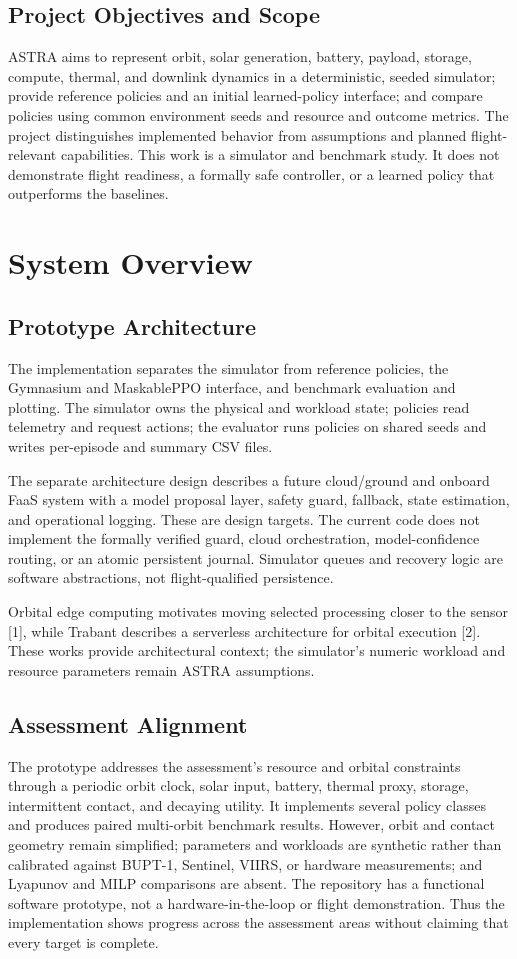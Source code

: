 \documentclass[11pt,letterpaper]{article}
\begin{document}
\subsection{Project Objectives and Scope}
ASTRA aims to represent orbit, solar generation, battery, payload, storage, compute, thermal, and downlink dynamics in a deterministic, seeded simulator; provide reference policies and an initial learned-policy interface; and compare policies using common environment seeds and resource and outcome metrics. The project distinguishes implemented behavior from assumptions and planned flight-relevant capabilities. This work is a simulator and benchmark study. It does not demonstrate flight readiness, a formally safe controller, or a learned policy that outperforms the baselines.

\section{System Overview}
\subsection{Prototype Architecture}
The implementation separates the simulator from reference policies, the Gymnasium and MaskablePPO interface, and benchmark evaluation and plotting. The simulator owns the physical and workload state; policies read telemetry and request actions; the evaluator runs policies on shared seeds and writes per-episode and summary CSV files.

The separate architecture design describes a future cloud/ground and onboard FaaS system with a model proposal layer, safety guard, fallback, state estimation, and operational logging. These are design targets. The current code does not implement the formally verified guard, cloud orchestration, model-confidence routing, or an atomic persistent journal. Simulator queues and recovery logic are software abstractions, not flight-qualified persistence.

Orbital edge computing motivates moving selected processing closer to the sensor [1], while Trabant describes a serverless architecture for orbital execution [2]. These works provide architectural context; the simulator's numeric workload and resource parameters remain ASTRA assumptions.

\subsection{Assessment Alignment}
The prototype addresses the assessment's resource and orbital constraints through a periodic orbit clock, solar input, battery, thermal proxy, storage, intermittent contact, and decaying utility. It implements several policy classes and produces paired multi-orbit benchmark results. However, orbit and contact geometry remain simplified; parameters and workloads are synthetic rather than calibrated against BUPT-1, Sentinel, VIIRS, or hardware measurements; and Lyapunov and MILP comparisons are absent. The repository has a functional software prototype, not a hardware-in-the-loop or flight demonstration. Thus the implementation shows progress across the assessment areas without claiming that every target is complete.
\end{document}
